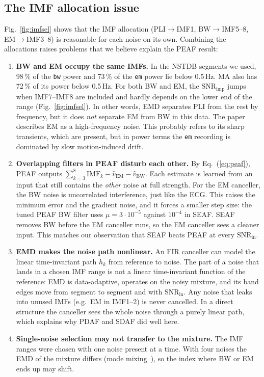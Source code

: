\documentclass[11pt,a4paper]{article}
\newcommand{\imf}[1]{\mathrm{IMF}_{#1}}
\newcommand{\snrin}{\mathrm{SNR}_\mathrm{in}}
\newcommand{\snrimp}{\mathrm{SNR}_\mathrm{imp}}
\begin{document}
\subsection{The IMF allocation issue}
Fig.~\ref{fig:imfsel} shows that the IMF allocation (PLI$\to$IMF1, BW$\to$IMF5--8, EM$\to$IMF3--8) is reasonable for
each noise on its own. Combining the allocations raises problems that we believe explain the PEAF result:
\begin{enumerate}
  \item \textbf{BW and EM occupy the same IMFs.} In the NSTDB segments we used, 98\,\% of the \texttt{bw} power and
        73\,\% of the \texttt{em} power lie below 0.5\,Hz. MA also has 72\,\% of its power below 0.5\,Hz. For both BW
        and EM, the $\snrimp$ jumps when IMF7--IMF8 are included and hardly depends on the lower end of the range
        (Fig.~\ref{fig:imfsel}). In other words, EMD separates PLI from the rest by frequency, but it does
        \emph{not} separate EM from BW in this data. The paper describes EM as a high-frequency noise. This probably
        refers to its sharp transients, which are present, but in power terms the \texttt{em} recording is dominated
        by slow motion-induced drift.
  \item \textbf{Overlapping filters in PEAF disturb each other.} By Eq.~(\ref{eq:peaf}), PEAF outputs
        $\sum_{k=3}^{8}\imf{k} - \hat v_\mathrm{EM} - \hat v_\mathrm{BW}$. Each estimate is learned from an input that
        still contains the \emph{other} noise at full strength. For the EM canceller, the BW noise is uncorrelated
        interference, just like the ECG. This raises the minimum error and the gradient noise, and it forces a smaller
        step size: the tuned PEAF BW filter uses $\mu=3{\cdot}10^{-5}$ against $10^{-4}$ in SEAF. SEAF removes BW
        before the EM canceller runs, so the EM canceller sees a cleaner input. This matches our observation that SEAF
        beats PEAF at every $\snrin$.
  \item \textbf{EMD makes the noise path nonlinear.} An FIR canceller can model the linear time-invariant path
        $h_k$ from reference to noise. The part of a noise that lands in a chosen IMF range is not a linear
        time-invariant function of the reference: EMD is data-adaptive, operates on the noisy mixture, and its band
        edges move from segment to segment and with $\snrin$. Any noise that leaks into unused IMFs (e.g.\ EM in
        IMF1--2) is never cancelled. In a direct structure the canceller sees the whole noise through a purely linear
        path, which explains why PDAF and SDAF did well here.
  \item \textbf{Single-noise selection may not transfer to the mixture.} The IMF ranges were chosen with one noise
        present at a time. With four noises the EMD of the mixture differs (mode mixing~\cite{wu_eemd}), so the
        index where BW or EM ends up may shift.
\end{enumerate}
\end{document}
